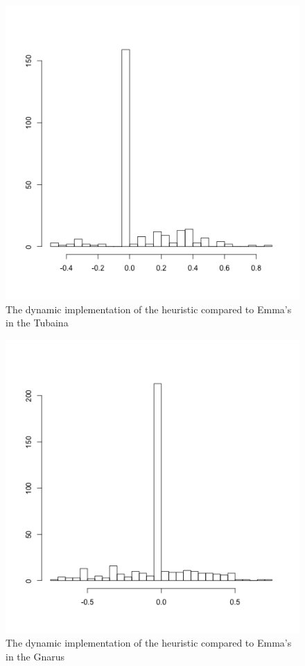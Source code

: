 \documentclass{sig-alternate}
\begin{document}
\begin{figure}[h!H]
  \centering
  \includegraphics[scale=0.4]{../stats/tubaina-histograma-aspectj.png}
  \caption{The dynamic implementation of the heuristic compared to Emma's in the Tubaina}
  \label{fig:tubaina-aj}
\end{figure}

\begin{figure}[h!H]
  \centering
  \includegraphics[scale=0.4]{../stats/gnarus-histograma-aspectj.png}
  \caption{The dynamic implementation of the heuristic compared to Emma's in the Gnarus}
  \label{fig:gnarus-aj}
\end{figure}
\end{document}

